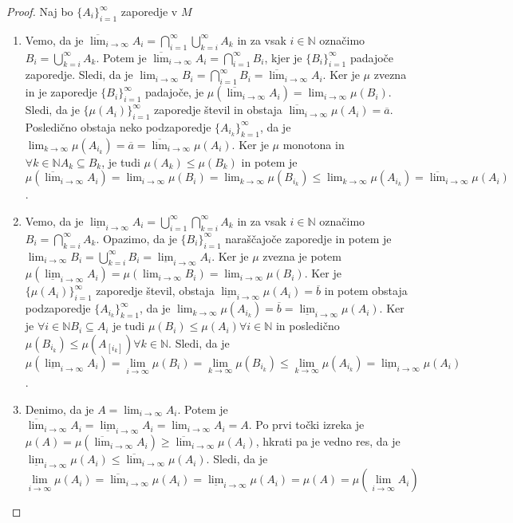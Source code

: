 \documentclass[a4paper, 10pt]{article}
\newcommand{\mth}[1]{\ensuremath{\mathbb{#1}}}
\newcommand{\N}{\mth{N}}
\begin{document}
		\begin{proof}
			Naj bo $\{A_i\}_{i=1}^{\infty}$ zaporedje v $M$
			\begin{enumerate}
				\item Vemo, da je $\overline{\lim}_{i\to\infty}A_i = \bigcap_{i = 1}^\infty \bigcup_{k = i}^{\infty} A_k$ in za vsak $i\in\N$ označimo $B_i = \bigcup_{k = i}^{\infty} A_k$. Potem je $\overline{\lim}_{i\to\infty}A_i = \bigcap_{i = 1}^\infty B_i$, kjer je $\{B_i\}_{i = 1}^{\infty}$ padajoče zaporedje. Sledi, da je $\lim_{i\to\infty}B_i = \bigcap_{i = 1}^{\infty} B_i = \overline{\lim}_{i\to\infty}A_i$. Ker je $\mu$ zvezna in je zaporedje $\{B_i\}_{i = 1}^{\infty}$ padajoče, je $\mu(\overline{\lim}_{i\to\infty}A_i) = \lim_{i\to\infty}\mu(B_i)$. Sledi, da je $\{\mu(A_i)\}_{i = 1}^{\infty}$ zaporedje števil in obstaja $\overline{\lim}_{i\to\infty}\mu(A_i) = \overline{a}$. Posledično obstaja neko podzaporedje $\{A_{i_k}\}_{k=1}^{\infty}$, da je $\lim_{k\to\infty}\mu(A_{i_k}) = \overline{a} = \overline{\lim}_{i\to\infty}\mu(A_i)$. Ker je $\mu$ monotona in $\forall k\in \N A_k\subseteq B_k$, je tudi $\mu(A_k) \leq \mu(B_k)$ in potem je $\mu(\overline{\lim}_{i\to\infty}A_i) = \lim_{i\to\infty}\mu(B_i) = \lim_{k\to\infty}\mu(B_{i_k}) \leq \lim_{k\to\infty}\mu(A_{i_k})  = \overline{\lim}_{i\to\infty}\mu(A_i)$.
				\item Vemo, da je $\underline{\lim}_{i\to\infty}A_i = \bigcup_{i = 1}^\infty \bigcap_{k = i}^{\infty} A_k$ in za vsak $i\in\N$ označimo $B_i = \bigcap_{k = i}^{\infty} A_k$. Opazimo, da je $\{B_i\}_{i = 1}^\infty$ naraščajoče zaporedje in potem je $\lim_{i\to\infty}B_i = \bigcup_{k = i}^{\infty} B_i = \underline{\lim}_{i\to\infty}A_i$. Ker je $\mu$ zvezna je potem $\mu(\underline{\lim}_{i\to\infty}A_i) = \mu(\lim_{i\to\infty}B_i) = \lim_{i\to\infty}\mu(B_i)$. Ker je $\{\mu(A_i)\}_{i = 1}^\infty$ zaporedje števil, obstaja $\underline{\lim}_{i\to\infty}\mu(A_i) = \overline{b}$ in potem obstaja podzaporedje $\{A_{i_k}\}_{k=1}^{\infty}$, da je $\lim_{k\to\infty}\mu(A_{i_k}) = \overline{b} = \underline{\lim}_{i\to\infty}\mu(A_i)$. Ker je $\forall i\in\N B_i \subseteq A_i$ je tudi $\mu(B_i) \leq \mu(A_i) \forall i\in\N$ in posledično $\mu(B_{i_k}) \leq \mu(A_[i_k]) \forall k\in\N$. Sledi, da je $$\mu(\underline{\lim}_{i\to\infty}A_i) = \lim_{i\to\infty}\mu(B_i) = \lim_{k\to\infty}\mu(B_{i_k}) \leq \lim_{k\to\infty}\mu(A_{i_k}) = \underline{\lim}_{i\to\infty}\mu(A_i)$$.
				\item Denimo, da je $A =\lim_{i\to\infty} A_i$. Potem je $\overline{\lim}_{i\to\infty}A_i = \underline{\lim}_{i\to\infty}A_i = \lim_{i\to\infty}A_i = A$. Po prvi točki izreka je $\mu(A) = \mu(\overline{\lim}_{i\to\infty}A_i) \geq \overline{\lim}_{i\to\infty}\mu(A_i)$, hkrati pa je vedno res, da je $\underline{\lim}_{i\to\infty}\mu(A_i) \leq \overline{\lim}_{i\to\infty}\mu(A_i)$. Sledi, da je $$\lim_{i\to\infty}\mu(A_i) = \overline{\lim}_{i\to\infty}\mu(A_i) = \underline{\lim}_{i\to\infty}\mu(A_i) = \mu(A) = \mu(\lim_{i\to\infty}A_i)$$
			\end{enumerate}
		\end{proof}
\end{document}
